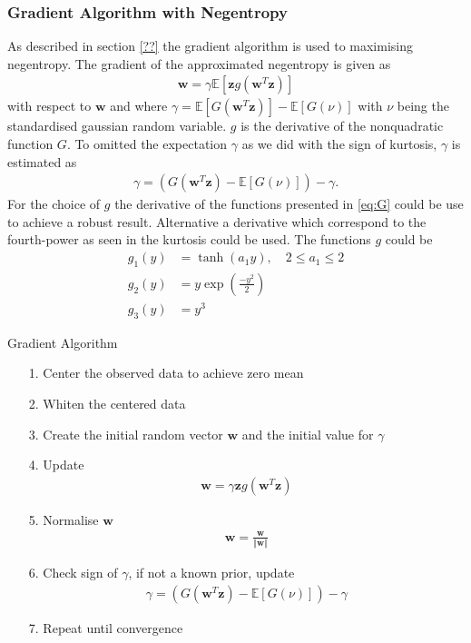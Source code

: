 \subsubsection*{Gradient Algorithm with Negentropy}
As described in section \ref{??} the gradient algorithm is used to maximising negentropy. The gradient of the approximated negentropy is given as
\begin{align*}
\mathbf{w} = \gamma \mathbb{E}[\mathbf{z} g(\mathbf{w}^T \mathbf{z})]
\end{align*}
with respect to $\mathbf{w}$ and where $\gamma = \mathbb{E}[G(\mathbf{w}^T \mathbf{z})] - \mathbb{E}[G(\nu)]$ with $\nu$ being the standardised gaussian random variable. $g$ is the derivative of the nonquadratic function $G$. To omitted the expectation $\gamma$ as we did with the sign of kurtosis, $\gamma$ is estimated as
\begin{align*}
\gamma = (G(\mathbf{w}^T \mathbf{z}) - \mathbb{E}[G(\nu)]) - \gamma.
\end{align*}
For the choice of $g$ the derivative of the functions presented in \eqref{eq:G} could be use to achieve a robust result. Alternative a derivative which correspond to the fourth-power as seen in the kurtosis could be used. The functions $g$ could be
\begin{align*}
g_1 (y) &= \tanh (a_1 y), \quad 2 \leq a_1 \leq 2  \\
g_2 (y) &= y \exp\left( \frac{-y^2}{2} \right) \\
g_3 (y) &= y^3
\end{align*}

\begin{algorithm}[H]
\caption{Gradient Algorithm}
\begin{itemize}
\item[1.] Center the observed data to achieve zero mean
\item[2.] Whiten the centered data
\item[3.] Create the initial random vector $\mathbf{w}$ and the initial value for $\gamma$
\item[4.] Update
\begin{align*}
\mathbf{w} = \gamma \mathbf{z} g(\mathbf{w}^T \mathbf{z})
\end{align*}
\item[5.] Normalise $\mathbf{w}$
\begin{align*}
\mathbf{w} = \frac{\mathbf{w}}{\Vert \mathbf{w} \Vert}
\end{align*}
\item[6.] Check sign of $\gamma$, if not a known prior, update
\begin{align*}
\gamma = (G(\mathbf{w}^T \mathbf{z}) - \mathbb{E}[G(\nu)]) - \gamma
\end{align*}
\item[7.] Repeat until convergence
\end{itemize}
\end{algorithm}

